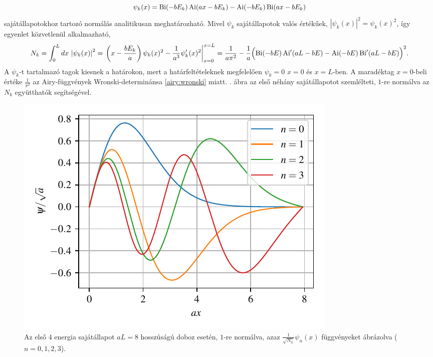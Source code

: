 \begin{equation}
	\psi_k(x) = \operatorname{Bi}(-bE_k)\operatorname{Ai}(ax-bE_k) - \operatorname{Ai}(-bE_k)\operatorname{Bi}(ax-bE_k)
	\label{vegesf:psik}
\end{equation}
sajátállapotokhoz tartozó normálás analitikusan meghatározható. Mivel $\psi_k$ sajátállapotok valós értékűek, $\left|\psi_k(x)\right|^2 = \psi_k(x)^2$, így  egyenlet közvetlenül alkalmazható,
\begin{dmath}
	N_k = \int_0^Ldx\,\left|\psi_k(x)\right|^2 = \left.\left(x-\frac{bE_k}{a}\right)\psi_k(x)^2 - \frac{1}{a^3}\psi_k^\prime(x)^2\right|_{x=0}^{x=L} = \frac{1}{a\pi^2}-\frac{1}{a}\Bigl(\Bi(-bE)\Aip(aL-bE)-\Ai(-bE)\Bip(aL-bE)\Bigr)^2.
	\label{vegesf:nk}
\end{dmath}
A $\psi_k$-t tartalmazó tagok kiesnek a határokon, mert a határfeltételeknek megfelelően $\psi_k=0$ $x=0$ és $x=L$-ben. A maradéktag $x=0$-beli értéke $\frac{1}{\pi^2}$ az Airy-függvények Wronski-determinánsa \eqref{airy:wronski} miatt. . ábra az első néhány sajátállapotot szemlélteti,  $1$-re normálva az $N_k$ együtthatók segítségével.
\begin{figure}[H]
	\centering
	\includegraphics[scale=1]{./figs/allapotok.pdf}
	\caption[Sajátállapotok]{Az első $4$ energia sajátállapot $aL=8$ hosszúságú doboz esetén, $1$-re normálva, azaz $\frac{1}{\sqrt{N_n}}\psi_n(x)$ függvényeket ábrázolva ($n=0,1,2,3$).}
	\label{vegesf:eigenstates}
\end{figure}
	
